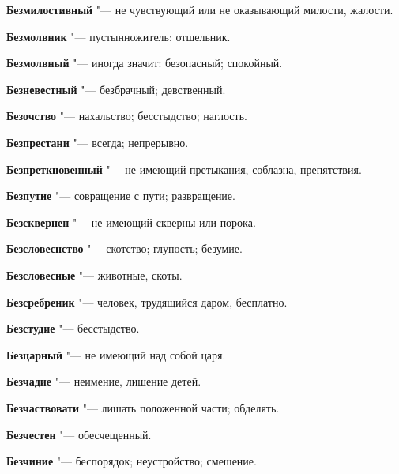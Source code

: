 \begin{mymulticols}{2}
\noindent\textbf{Безмилостивный} "--- не чувствующий или не оказывающий милости, жалости. 




\noindent\textbf{Безмолвник} "--- пустынножитель; отшельник. 




\noindent\textbf{Безмолвный} "--- иногда значит: безопасный; спокойный. 




\noindent\textbf{Безневестный} "--- безбрачный; девственный. 




\noindent\textbf{Безочство} "--- нахальство; бесстыдство; наглость. 




\noindent\textbf{Безпрестани} "--- всегда; непрерывно. 




\noindent\textbf{Безпреткновенный} "--- не имеющий претыкания, соблазна, препятствия. 




\noindent\textbf{Безпутие} "--- совращение с пути; развращение. 




\noindent\textbf{Безсквернен} "--- не имеющий скверны или порока. 




\noindent\textbf{Безсловеснство} "--- скотство; глупость; безумие. 




\noindent\textbf{Безсловесные} "--- животные, скоты. 




\noindent\textbf{Безсребреник} "--- человек, трудящийся даром, бесплатно. 




\noindent\textbf{Безстудие} "--- бесстыдство. 




\noindent\textbf{Безцарный} "--- не имеющий над собой царя. 




\noindent\textbf{Безчадие} "--- неимение, лишение детей. 




\noindent\textbf{Безчаствовати} "--- лишать положенной части; обделять. 




\noindent\textbf{Безчестен} "--- обесчещенный. 




\noindent\textbf{Безчиние} "--- беспорядок; неустройство; смешение. 





\end{mymulticols}
